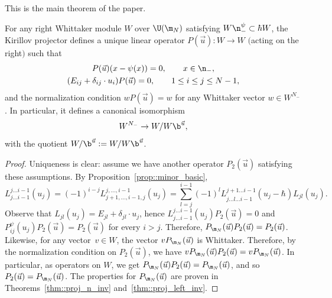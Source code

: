 	This is the main theorem of the paper.
	\begin{Theorem}
		\label{thm::main_thm}
		For any right Whittaker module $W$ over $\U(\m_N)$ satisfying $W\n_-^{\psi} \subset \hbar W$, the Kirillov projector defines a unique linear operator $P(\vec{u})\colon W \rightarrow W$ $($acting on the right$)$ such that
		\begin{gather*}
			P(\vec{u}) (x-\psi(x)) = 0,\qquad x\in \n_-, \\
			(E_{ij} + \delta_{ij}\cdot u_i) P(\vec{u}) = 0,\qquad 1\leq i \leq j \leq N-1,
		\end{gather*}
		and the normalization condition
		$
		w P(\vec{u}) = w
		$
		for any Whittaker vector $w\in W^{N_-}$. In particular, it defines a canonical isomorphism
		\begin{equation}
			\label{eq::kirillov_proj_iso_inv_quot}
			W^{N_-} \rightarrow W/ W \b^{\vec{u}},
		\end{equation}
		with the quotient $W/\b^{\vec{u}} := W/ W\b^{\vec{u}}$.
		\begin{proof}
			Uniqueness is clear: assume we have another operator $P_2(\vec{u})$ satisfying these assumptions. By Proposition~\ref{prop::minor_basic},
			\[
			L_{j\dots i-1}^{j \dots i-1}(u_{j}) = (-1)^{i-j} L_{j+1,\dots,i-1,j}^{j,\dots,i-1}(u_j) = \sum\limits_{l=j}^{i-1} (-1)^{l} L_{j\dots \hat{l} \dots i-1}^{j+1 \dots i-1}(u_j-\hbar) L_{jl}(u_j).
			\]
			Observe that $L_{jl}(u_j) = E_{jl} + \delta_{jl}\cdot u_j$, hence $L_{j\dots i-1}^{j\dots i-1}(u_j) P_2 (\vec{u}) = 0$ and
$
			P_{ij}^{\psi}(u_j) P_2(\vec{u}) = P_2(\vec{u})
$
			for every $i > j$. Therefore,
$
			P_{\m_N}(\vec{u}) P_2(\vec{u}) = P_2(\vec{u})$.
			Likewise, for any vector~$v\in W$, the vector $v P_{\m_N}(\vec{u})$ is Whittaker. Therefore, by the normalization condition on $P_2(\vec{u})$, we have
$
			vP_{\m_N}(\vec{u}) P_2(\vec{u}) = vP_{\m_N}(\vec{u})$.
			In particular, as operators on $W$, we get
$
			P_{\m_N}(\vec{u}) P_2(\vec{u}) = P_{\m_N}(\vec{u})$,
			and so
			$
			P_2(\vec{u}) = P_{\m_N}(\vec{u})$.
			The properties for $P_{\m_N}(\vec{u})$ are proven in Theorems~\ref{thm::proj_n_inv} and~\ref{thm::proj_left_inv}.
		\end{proof}
	\end{Theorem}
	
